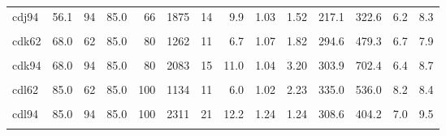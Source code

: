 \begin{landscape}
\begin{longtable}[t]{lrrrrrrrrrrrrr}
cdj94 & 56.1 & 94 & 85.0 & 66 & 1875 & 14 & 9.9 & 1.03 & 1.52 & 217.1 & 322.6 & 6.2 & 8.3\\
\cellcolor{gray!6}{cdk46} & \cellcolor{gray!6}{68.0} & \cellcolor{gray!6}{46} & \cellcolor{gray!6}{85.0} & \cellcolor{gray!6}{80} & \cellcolor{gray!6}{1530} & \cellcolor{gray!6}{13} & \cellcolor{gray!6}{8.1} & \cellcolor{gray!6}{1.06} & \cellcolor{gray!6}{1.13} & \cellcolor{gray!6}{330.2} & \cellcolor{gray!6}{525.1} & \cellcolor{gray!6}{8.5} & \cellcolor{gray!6}{8.6}\\
cdk62 & 68.0 & 62 & 85.0 & 80 & 1262 & 11 & 6.7 & 1.07 & 1.82 & 294.6 & 479.3 & 6.7 & 7.9\\
\cellcolor{gray!6}{cdk78} & \cellcolor{gray!6}{68.0} & \cellcolor{gray!6}{78} & \cellcolor{gray!6}{85.0} & \cellcolor{gray!6}{80} & \cellcolor{gray!6}{1560} & \cellcolor{gray!6}{13} & \cellcolor{gray!6}{8.3} & \cellcolor{gray!6}{1.01} & \cellcolor{gray!6}{1.75} & \cellcolor{gray!6}{280.6} & \cellcolor{gray!6}{582.6} & \cellcolor{gray!6}{6.5} & \cellcolor{gray!6}{10.1}\\
cdk94 & 68.0 & 94 & 85.0 & 80 & 2083 & 15 & 11.0 & 1.04 & 3.20 & 303.9 & 702.4 & 6.4 & 8.7\\
\cellcolor{gray!6}{cdl46} & \cellcolor{gray!6}{85.0} & \cellcolor{gray!6}{46} & \cellcolor{gray!6}{85.0} & \cellcolor{gray!6}{100} & \cellcolor{gray!6}{803} & \cellcolor{gray!6}{11} & \cellcolor{gray!6}{4.2} & \cellcolor{gray!6}{1.09} & \cellcolor{gray!6}{1.56} & \cellcolor{gray!6}{343.8} & \cellcolor{gray!6}{355.7} & \cellcolor{gray!6}{9.0} & \cellcolor{gray!6}{9.0}\\
cdl62 & 85.0 & 62 & 85.0 & 100 & 1134 & 11 & 6.0 & 1.02 & 2.23 & 335.0 & 536.0 & 8.2 & 8.4\\
\cellcolor{gray!6}{cdl78} & \cellcolor{gray!6}{85.0} & \cellcolor{gray!6}{78} & \cellcolor{gray!6}{85.0} & \cellcolor{gray!6}{100} & \cellcolor{gray!6}{1735} & \cellcolor{gray!6}{12} & \cellcolor{gray!6}{9.2} & \cellcolor{gray!6}{1.04} & \cellcolor{gray!6}{1.94} & \cellcolor{gray!6}{257.1} & \cellcolor{gray!6}{317.9} & \cellcolor{gray!6}{6.6} & \cellcolor{gray!6}{10.5}\\
cdl94 & 85.0 & 94 & 85.0 & 100 & 2311 & 21 & 12.2 & 1.24 & 1.24 & 308.6 & 404.2 & 7.0 & 9.5\\
\cellcolor{gray!6}{cdm46} & \cellcolor{gray!6}{44.0} & \cellcolor{gray!6}{46} & \cellcolor{gray!6}{110.0} & \cellcolor{gray!6}{40} & \cellcolor{gray!6}{1413} & \cellcolor{gray!6}{19} & \cellcolor{gray!6}{7.5} & \cellcolor{gray!6}{1.39} & \cellcolor{gray!6}{3.14} & \cellcolor{gray!6}{363.0} & \cellcolor{gray!6}{620.8} & \cellcolor{gray!6}{7.1} & \cellcolor{gray!6}{13.7}\\

\end{longtable}
\end{landscape}

